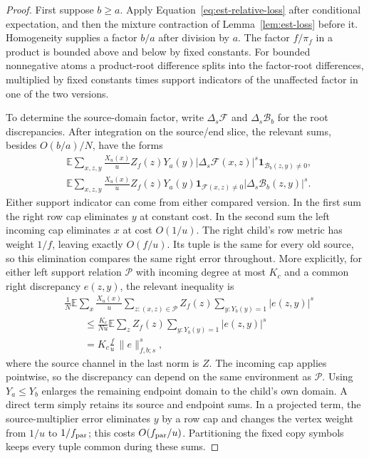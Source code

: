 \begin{proof}
First suppose $b\ge a$.  Apply
Equation~\eqref{eq:est-relative-loss} after conditional expectation, and
then the mixture contraction of Lemma~\ref{lem:est-loss} before it.
Homogeneity supplies a factor $b/a$ after division by $a$.
The factor $f/\pi_f$ in a product is bounded above and below by fixed
constants.  For bounded nonnegative atoms a product-root difference splits
into the factor-root differences, multiplied by fixed constants times
support indicators of the unaffected factor in one of the two versions.

To determine the source-domain factor, write
$\Delta_s\mathcal F$ and $\Delta_s\mathcal B_b$ for the root discrepancies.
After integration on the source/end slice, the relevant sums, besides
$O(b/a)/N$, have the forms
\begin{align*}
 &\mathbb E\sum_{x,z,y}\frac{X_u(x)}u Z_f(z)Y_a(y)
       |\Delta_s\mathcal F(x,z)|^s
       \mathbf1_{\mathcal B_b(z,y)\ne0},\\
 &\mathbb E\sum_{x,z,y}\frac{X_u(x)}u Z_f(z)Y_a(y)
       \mathbf1_{\mathcal F(x,z)\ne0}
       |\Delta_s\mathcal B_b(z,y)|^s.
\end{align*}
Either support indicator can come from either compared version.  In the
first sum the right row cap eliminates $y$ at constant cost.  In the
second sum the left incoming cap eliminates $x$ at cost $O(1/u)$.
The right child's row metric has weight $1/f$, leaving exactly $O(f/u)$.
Its tuple is the same for every old source, so this elimination compares
the same right error throughout.  More explicitly, for either left
support relation $\mathcal P$ with incoming degree at most $K_c$ and
a common right discrepancy $e(z,y)$, the relevant inequality is
\begin{align*}
 &\frac1N\mathbb E\sum_x\frac{X_u(x)}u
       \sum_{z:(x,z)\in\mathcal P}Z_f(z)
       \sum_{y:Y_b(y)=1}|e(z,y)|^s\\
 &\qquad\leq \frac{K_c}{Nu}\mathbb E\sum_z Z_f(z)
       \sum_{y:Y_b(y)=1}|e(z,y)|^s\\
 &\qquad=K_c\frac fu\,\|e\|_{f,b;s}^s,
\end{align*}
where the source channel in the last norm is $Z$.
The incoming cap applies pointwise, so the discrepancy can depend on
the same environment as $\mathcal P$.
Using $Y_a\le Y_b$ enlarges the remaining
endpoint domain to the child's own domain.  A direct term simply retains
its source and endpoint sums.  In a projected term, the source-multiplier
error eliminates $y$ by a row cap and changes the vertex weight from
$1/u$ to $1/f_{\rm par}$; this costs $O(f_{\rm par}/u)$.
Partitioning the fixed copy symbols keeps every tuple common during these
sums.


\end{proof}
